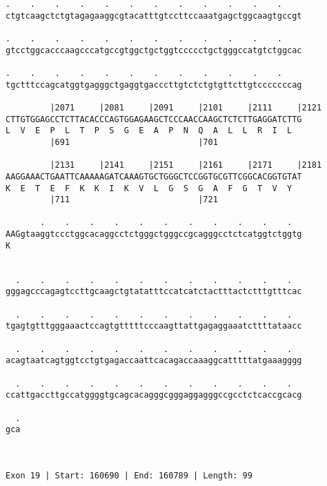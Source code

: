 \documentclass{article}
\begin{document}
\begin{Verbatim}
.    .    .    .    .    .    .    .    .    .    .    .    
ctgtcaagctctgtagagaaggcgtacatttgtccttccaaatgagctggcaagtgccgt
                                                            
.    .    .    .    .    .    .    .    .    .    .    .    
gtcctggcacccaagcccatgccgtggctgctggtccccctgctgggccatgtctggcac
                                                            
.    .    .    .    .    .    .    .    .    .    .    .    
tgctttccagcatggtgagggctgaggtgacccttgtctctgtgttcttgtcccccccag
                                                            
         |2071     |2081     |2091     |2101     |2111     |2121
CTTGTGGAGCCTCTTACACCCAGTGGAGAAGCTCCCAACCAAGCTCTCTTGAGGATCTTG
L  V  E  P  L  T  P  S  G  E  A  P  N  Q  A  L  L  R  I  L  
         |691                          |701                 
  
         |2131     |2141     |2151     |2161     |2171     |2181
AAGGAAACTGAATTCAAAAAGATCAAAGTGCTGGGCTCCGGTGCGTTCGGCACGGTGTAT
K  E  T  E  F  K  K  I  K  V  L  G  S  G  A  F  G  T  V  Y  
         |711                          |721                 
  
       .    .    .    .    .    .    .    .    .    .    .  
AAGgtaaggtccctggcacaggcctctgggctgggccgcagggcctctcatggtctggtg
K                                                           
                                                            
  
  .    .    .    .    .    .    .    .    .    .    .    .  
gggagcccagagtccttgcaagctgtatatttccatcatctactttactctttgtttcac
                                                            
  .    .    .    .    .    .    .    .    .    .    .    .  
tgagtgtttgggaaactccagtgtttttcccaagttattgagaggaaatcttttataacc
                                                            
  .    .    .    .    .    .    .    .    .    .    .    .  
acagtaatcagtggtcctgtgagaccaattcacagaccaaaggcatttttatgaaagggg
                                                            
  .    .    .    .    .    .    .    .    .    .    .    .  
ccattgaccttgccatggggtgcagcacagggcgggaggagggccgcctctcaccgcacg
                                                            
  .
gca
   
   
 
Exon 19 | Start: 160690 | End: 160789 | Length: 99




\end{Verbatim}
\end{document}
